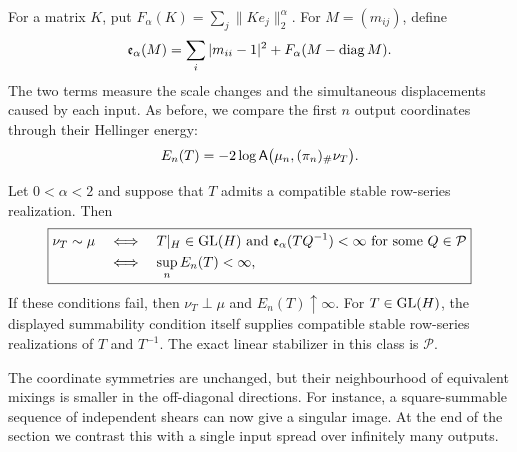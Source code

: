 For a matrix \(K\), put \(F_\alpha(K)=\sum_j\|Ke_j\|_2^\alpha\).  For
\(M=(m_{ij})\), define
\begin{equation}
 \mathfrak e_\alpha(M)
 =\sum_i|m_{ii}-1|^2
  +F_\alpha(M-\operatorname{diag} M).
 \label{eq:stable-mixing-cost}
\end{equation}
The two terms measure the scale changes and the simultaneous displacements
caused by each input. As before, we compare the first \(n\) output coordinates
through their Hellinger energy:
\begin{equation}
 E_n(T)
 =-2\log\mathsf A\bigl(
       \mu_n,(\pi_n)_\#\nu_{T}\bigr).
\end{equation}

\begin{theorem}
\label{thm:complete-criterion-symmetric-stable-coordinates}
Let \(0<\alpha<2\) and suppose that \(T\) admits a compatible stable
row-series realization.  Then
\begin{equation}
 \boxed{\begin{aligned}
 \nu_{T}\sim\mu
 &\quad\Longleftrightarrow\quad
 T|_H\in\operatorname{GL}(H)\ \text{and}\
 \mathfrak e_\alpha(TQ^{-1})<\infty
       \ \text{for some }Q\in\mathcal P\\
 &\quad\Longleftrightarrow\quad
 \sup_nE_n(T)<\infty,
 \end{aligned}}
\end{equation}
If these conditions fail, then
\(\nu_{T}\perp\mu\) and
\(E_n(T)\uparrow\infty\).
For \(T\in\operatorname{GL}(H)\), the displayed summability condition itself supplies
compatible stable row-series realizations of \(T\) and \(T^{-1}\).
The exact linear stabilizer in this class is \(\mathcal P\).
\end{theorem}

The coordinate symmetries are unchanged, but their neighbourhood of
equivalent mixings is smaller in the off-diagonal directions. For instance,
a square-summable sequence of independent shears can now give a singular
image. At the end of the section we contrast this with a single input
spread over infinitely many outputs.

